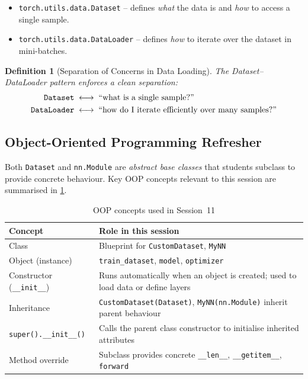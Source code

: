 \documentclass[12pt,a4paper]{article}
\newtheorem{definition}{Definition}[section]
\begin{document}
\begin{itemize}
  \item \texttt{torch.utils.data.Dataset} -- defines \emph{what} the data is
        and \emph{how} to access a single sample.
  \item \texttt{torch.utils.data.DataLoader} -- defines \emph{how} to iterate
        over the dataset in mini-batches.
\end{itemize}

\begin{definition}[Separation of Concerns in Data Loading]
\label{def:separation}
The \emph{Dataset--DataLoader} pattern enforces a clean separation:
\begin{align}
  \texttt{Dataset} &\;\longleftrightarrow\; \text{``what is a single sample?''} \notag \\
  \texttt{DataLoader} &\;\longleftrightarrow\; \text{``how do I iterate efficiently over many samples?''} \notag
\end{align}
\end{definition}

\subsection{Object-Oriented Programming Refresher}

Both \texttt{Dataset} and \texttt{nn.Module} are \emph{abstract base classes}
that students subclass to provide concrete behaviour.  Key OOP concepts
relevant to this session are summarised in \cref{tab:oop}.

\begin{table}[htbp]
  \centering
  \caption{OOP concepts used in Session~11}
  \label{tab:oop}
  \begin{tabularx}{\linewidth}{lX}
    \toprule
    \textbf{Concept} & \textbf{Role in this session} \\
    \midrule
    Class & Blueprint for \texttt{CustomDataset}, \texttt{MyNN} \\
    Object (instance) & \texttt{train\_dataset}, \texttt{model}, \texttt{optimizer} \\
    Constructor (\texttt{\_\_init\_\_}) & Runs automatically when an object is created; used to load data or define layers \\
    Inheritance & \texttt{CustomDataset(Dataset)}, \texttt{MyNN(nn.Module)} inherit parent behaviour \\
    \texttt{super().\_\_init\_\_()} & Calls the parent class constructor to initialise inherited attributes \\
    Method override & Subclass provides concrete \texttt{\_\_len\_\_}, \texttt{\_\_getitem\_\_}, \texttt{forward} \\
    \bottomrule
  \end{tabularx}
\end{table}
\end{document}
